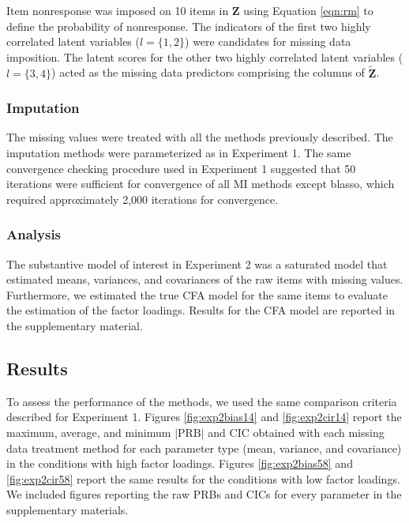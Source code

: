 	Item nonresponse was imposed on 10 items in $\bm{Z}$ using Equation \eqref{eqn:rm} to define the probability
	of nonresponse.
	The indicators of the first two highly correlated latent variables
	($l = \{1, 2\}$) were candidates for missing data imposition.
The latent scores for the other two highly correlated latent 
	variables ($l = \{3, 4\}$) acted as the missing data predictors comprising the columns of $\tilde{\bm{Z}}$.
	
\subsubsection{Imputation}
	
	The missing values were treated with all the methods previously described.
	The imputation methods were parameterized as in Experiment 1.
	The same convergence checking procedure used in Experiment 1 suggested that 50 iterations were sufficient for convergence of all MI methods except blasso, which required approximately 
	2,000 iterations for convergence.

\subsubsection{Analysis}
	
	The substantive model of interest in Experiment 2 was a saturated model that estimated means,
	variances, and covariances of the raw items with missing values.
	Furthermore, we estimated the true CFA model for the same items to evaluate the estimation of the factor loadings.
	Results for the CFA model are reported in the supplementary material.

\subsection{Results}
	To assess the performance of the methods, we used the same comparison criteria described for Experiment 1.
	Figures \ref{fig:exp2bias14} and \ref{fig:exp2cir14} report the maximum, average, and minimum $|\text{PRB}|$ and 
	CIC obtained with each missing data treatment method for each parameter type (mean, variance, and covariance) in 
	the conditions with high factor loadings.
	Figures \ref{fig:exp2bias58} and \ref{fig:exp2cir58} report the same results for the conditions with low 
	factor loadings.
	We included figures reporting the raw PRBs and CICs for every parameter in the supplementary materials.

